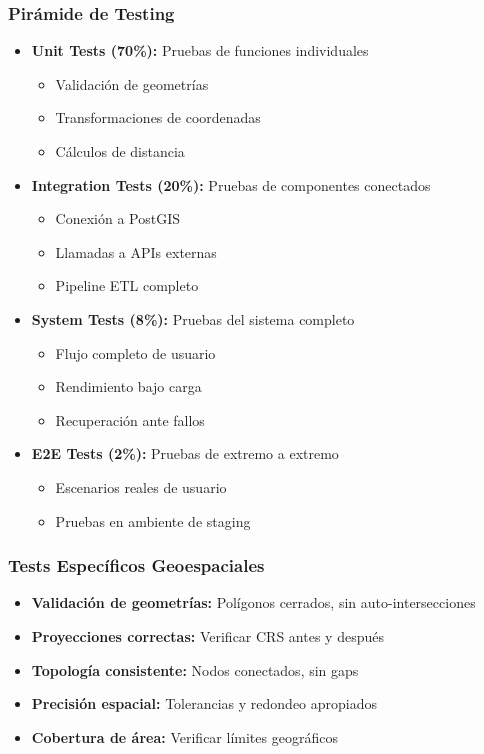 \documentclass[11pt,a4paper]{article}
\begin{document}
\subsubsection{Pirámide de Testing}
\begin{itemize}
    \item \textbf{Unit Tests (70\%):} Pruebas de funciones individuales
    \begin{itemize}
        \item Validación de geometrías
        \item Transformaciones de coordenadas
        \item Cálculos de distancia
    \end{itemize}
    \item \textbf{Integration Tests (20\%):} Pruebas de componentes conectados
    \begin{itemize}
        \item Conexión a PostGIS
        \item Llamadas a APIs externas
        \item Pipeline ETL completo
    \end{itemize}
    \item \textbf{System Tests (8\%):} Pruebas del sistema completo
    \begin{itemize}
        \item Flujo completo de usuario
        \item Rendimiento bajo carga
        \item Recuperación ante fallos
    \end{itemize}
    \item \textbf{E2E Tests (2\%):} Pruebas de extremo a extremo
    \begin{itemize}
        \item Escenarios reales de usuario
        \item Pruebas en ambiente de staging
    \end{itemize}
\end{itemize}

\subsubsection{Tests Específicos Geoespaciales}
\begin{itemize}
    \item \textbf{Validación de geometrías:} Polígonos cerrados, sin auto-intersecciones
    \item \textbf{Proyecciones correctas:} Verificar CRS antes y después
    \item \textbf{Topología consistente:} Nodos conectados, sin gaps
    \item \textbf{Precisión espacial:} Tolerancias y redondeo apropiados
    \item \textbf{Cobertura de área:} Verificar límites geográficos
\end{itemize}
\end{document}
